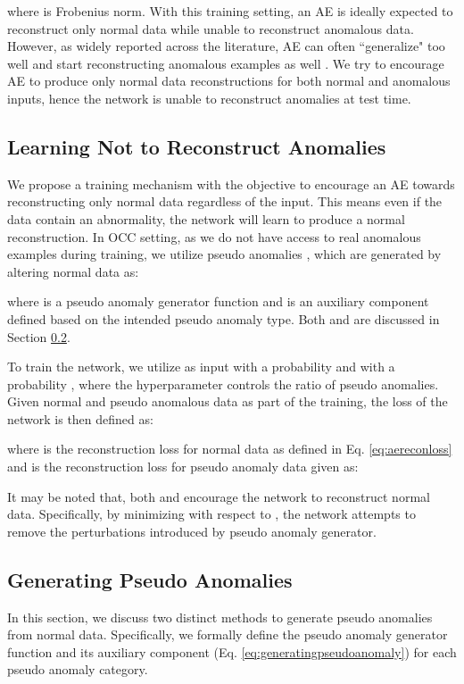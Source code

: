 \documentclass{bmvc2k}
\begin{document}
where  is Frobenius norm.
With this training setting, an AE is ideally expected to reconstruct only normal data while unable to reconstruct anomalous data. However, as widely reported across the literature, AE can often ``generalize" too well and start reconstructing anomalous examples as well \cite{zong2018deep,munawar2017limiting,zaheer2020old,gong2019memorizing}. We try to encourage AE to produce only normal data reconstructions for both normal and anomalous inputs,
hence the network is unable to reconstruct anomalies at test time.


\subsection{Learning Not to Reconstruct Anomalies}

We propose a training mechanism with the objective to encourage an AE towards reconstructing only normal data regardless of the input. This means even if the data contain an abnormality, the network will learn to produce a normal reconstruction. In OCC setting, as we do not have access to real anomalous examples during training, we utilize pseudo anomalies , which are 
generated by altering normal data  as: 

where  is a pseudo anomaly generator function and  is an auxiliary component defined based on the intended pseudo anomaly type. Both  and  are discussed in Section \ref{subsec:generatingpseudoanomalies}.




To train the network, we utilize  as input with a probability  and  with a probability , where the hyperparameter  controls the ratio of pseudo anomalies.
Given normal and pseudo anomalous data as part of the training,
the loss of the network is then defined as:

where  is the reconstruction loss for normal data as defined in Eq. \eqref{eq:aereconloss} and  is the reconstruction loss for pseudo anomaly data given as:

It may be noted that, both  and  encourage the network to reconstruct normal data. 
Specifically, by minimizing  with respect to , the network attempts to remove the perturbations introduced by pseudo anomaly generator.





\subsection{Generating Pseudo Anomalies}
\label{subsec:generatingpseudoanomalies}
In this section, we discuss two distinct methods to generate pseudo anomalies from normal data. 
Specifically, we formally define the pseudo anomaly generator function  and its auxiliary component  (Eq. \eqref{eq:generatingpseudoanomaly}) for each pseudo anomaly category. 
\end{document}
